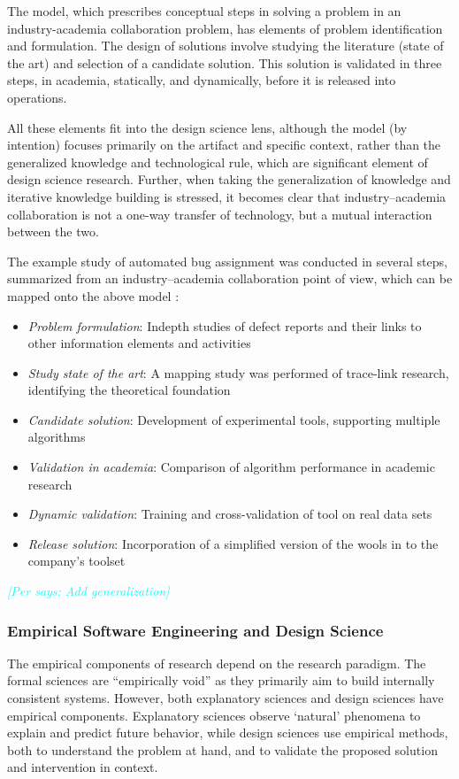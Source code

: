 \documentclass[graybox]{svmult}
\newcommand{\per}[1]{\textcolor{cyan}{{\it [Per says: #1]}}}
\newcommand{\per}[1]{}
\begin{document}
The model, which prescribes conceptual steps in solving a problem in an industry-academia collaboration problem, has elements of problem identification and formulation. The design of solutions involve studying the literature (state of the art) and selection of a candidate solution. This solution is validated in three steps, in academia, statically, and dynamically, before it is released into operations. 

All these elements fit into the design science lens, although the model (by intention) focuses primarily on the artifact and specific context, rather than the generalized knowledge and technological rule, which are significant element of design science research. Further, when taking the generalization of knowledge and iterative knowledge building is stressed, it becomes clear that industry--academia collaboration is not a one-way transfer of technology, but a mutual interaction between the two.

The example study of automated bug assignment was conducted in several steps, summarized from an industry--academia collaboration point of view, which can be mapped onto the above model \cite{CarverIEEESW2018}:
\begin{itemize}
\item \emph{Problem formulation}: Indepth studies of defect reports and their links to other information elements and activities
\item \emph{Study state of the art}: A mapping study was performed of trace-link research, identifying the theoretical foundation \cite{Borg2013EMSE}
\item \emph{Candidate solution}: Development of experimental tools, supporting multiple algorithms
\item \emph{Validation in academia}: Comparison of algorithm performance in academic research \cite{BorgESEM13}
\item \emph{Dynamic validation}: Training and cross-validation of tool on real data sets \cite{JonssonBug15}
\item \emph{Release solution}: Incorporation of a simplified version of the wools in to the company's toolset
\end{itemize} 

\per{Add generalization}


\subsubsection{Empirical Software Engineering and Design Science}
The empirical components of research depend on the research paradigm. The formal sciences are ``empirically void'' \cite{van_aken_management_2004} as they primarily aim to build internally consistent systems. However, both explanatory sciences and design sciences have empirical components. Explanatory sciences observe `natural' phenomena to explain and predict future behavior, while design sciences use empirical methods, both to understand the problem at hand, and to validate the proposed solution and intervention in context. 
\end{document}
